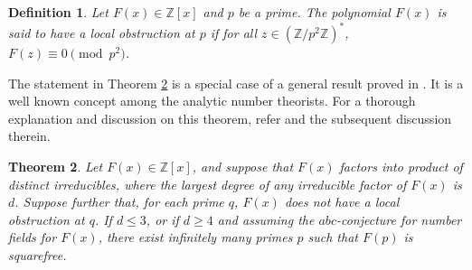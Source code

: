 \documentclass[table]{amsart}
\newtheorem{theorem}{Theorem}[section]
\newtheorem{definition}[theorem]{Definition}
\newcommand{\Z}{\mathbb{Z}}
\numberwithin{equation}{section}
\begin{document}
\begin{definition}
    Let $F(x) \in \Z[x]$ and $p$ be a prime. The polynomial $F(x)$ is said to have a local obstruction at $p$ if for all $z \in (\Z/p^2\Z)^*$, $F(z) \equiv 0 \pmod{p^2}$.
\end{definition}

The statement in Theorem \ref{2.5:cor} is a special case of a general result proved in \cite[Theorem 1.1]{Pasten2015}. It is a well known concept among the analytic number theorists. For a thorough explanation and discussion on this theorem, refer \cite[Remark 2.6]{L3} and the subsequent discussion therein.

\begin{theorem} \label{2.5:cor}
    Let $F(x) \in \Z[x]$, and suppose that $F(x)$ factors into product of distinct irreducibles, where the largest degree of any irreducible factor of $F(x)$ is $d$. Suppose further that, for each prime $q$, $F(x)$ does not have a local obstruction at $q$. If $d \leq 3$, or if $d \geq 4$ and assuming the $abc$-conjecture for number fields for $F(x)$, there exist infinitely many primes $p$ such that $F(p)$ is squarefree.
\end{theorem}
\end{document}
